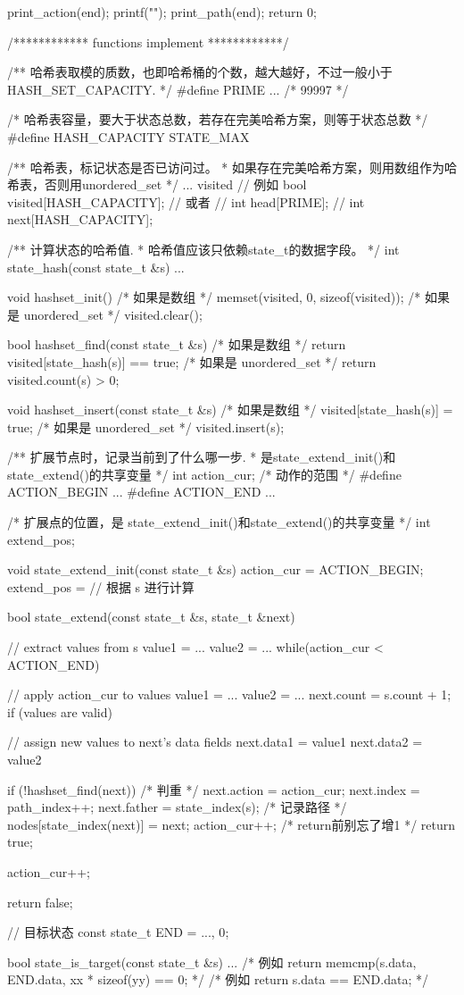 \begin{Codex}[label=bfs_template2.cpp]
{    print_action(end);
    printf("\n");
    print_path(end);
    return 0;
}

/************ functions implement ************/

/** 哈希表取模的质数，也即哈希桶的个数，越大越好，不过一般小于 HASH_SET_CAPACITY. */
#define PRIME ...  /* 99997 */

/* 哈希表容量，要大于状态总数，若存在完美哈希方案，则等于状态总数 */
#define HASH_CAPACITY STATE_MAX

/** 哈希表，标记状态是否已访问过。
 * 如果存在完美哈希方案，则用数组作为哈希表，否则用unordered_set
 */
... visited
// 例如 bool visited[HASH_CAPACITY];
// 或者
// int head[PRIME];
// int next[HASH_CAPACITY];

/** 计算状态的哈希值.
 * 哈希值应该只依赖state_t的数据字段。
 */
int state_hash(const state_t &s) {
    ...
}

void hashset_init() {
    /* 如果是数组 */
    memset(visited, 0, sizeof(visited));
    /* 如果是 unordered_set */
    visited.clear();
}

bool hashset_find(const state_t &s) {
    /* 如果是数组 */
    return visited[state_hash(s)] == true;
    /* 如果是 unordered_set */
    return visited.count(s) > 0;
}

void hashset_insert(const state_t &s) {
    /* 如果是数组 */
    visited[state_hash(s)] = true;
    /* 如果是 unordered_set */
    visited.insert(s);
}

/** 扩展节点时，记录当前到了什么哪一步.
 * 是state_extend_init()和state_extend()的共享变量
 */
int action_cur;
/* 动作的范围 */
#define ACTION_BEGIN ...
#define ACTION_END ...

/* 扩展点的位置，是 state_extend_init()和state_extend()的共享变量 */
int extend_pos;

void state_extend_init(const state_t &s) {
    action_cur = ACTION_BEGIN;
    extend_pos = // 根据 s 进行计算
}

bool state_extend(const state_t &s, state_t &next) {
    // extract values from s
    value1 = ...
    value2 = ...
    while(action_cur < ACTION_END) {
        // apply action_cur to values
        value1 = ...
        value2 = ...
        next.count = s.count + 1;
        if (values are valid) {
            // assign new values to next's data fields
            next.data1 = value1
            next.data2 = value2

            if (!hashset_find(next)) { /* 判重 */
                next.action = action_cur;
                next.index = path_index++;
                next.father = state_index(s);
                /* 记录路径 */
                nodes[state_index(next)] = next;
                action_cur++;  /* return前别忘了增1 */
                return true;
            }
        }
        action_cur++;
    }
    return false;
}

// 目标状态
const state_t END = {..., 0};

bool state_is_target(const state_t &s) {
    ...
    /* 例如 return memcmp(s.data, END.data, xx * sizeof(yy) == 0; */
    /* 例如 return s.data == END.data; */
}
\end{Codex}


